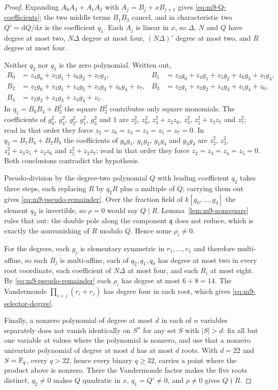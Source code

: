 \begin{proof}
Expanding $A_0A_3+A_1A_2$ with $A_j=B_j+xB_{j+1}$ gives
\eqref{eq:m9-Q-coefficients}; the two middle terms $B_1B_3$ cancel, and in
characteristic two $Q'=\mathrm dQ/\mathrm dx$ is the coefficient $q_1$.  Each
$A_j$ is linear in $x$, so $\Delta$, $N$ and $Q$ have degree at most two,
$N\Delta$ degree at most four, $(N\Delta)'$ degree at most two, and $R$
degree at most four.

Neither $q_2$ nor $q_1$ is the zero polynomial.  Written out,
\[
\begin{aligned}
 B_0&=z_4g_0+z_5g_1+z_6g_2+z_7g_3,&
 B_1&=z_3g_0+z_4g_1+z_5g_2+z_6g_3+z_7g_4,\\
 B_2&=z_2g_0+z_3g_1+z_4g_2+z_5g_3+z_6g_4+z_7,&
 B_3&=z_2g_1+z_3g_2+z_4g_3+z_5g_4+z_6,\\
 B_4&=z_2g_2+z_3g_3+z_4g_4+z_5 .
\end{aligned}
\]
In $q_1=B_0B_4+B_2^2$ the square $B_2^2$ contributes only square monomials.
The coefficients of $g_0^2$, $g_4^2$, $g_2^2$, $g_1^2$, $g_3^2$ and $1$ are
$z_2^2$, $z_6^2$, $z_4^2+z_2z_6$, $z_3^2$, $z_5^2+z_3z_7$ and $z_7^2$; read
in that order they force $z_2=z_6=z_4=z_3=z_5=z_7=0$.  In
$q_2=B_1B_4+B_2B_3$ the coefficients of $g_0g_1$, $g_1g_2$, $g_1g_4$ and
$g_3g_4$ are $z_2^2$, $z_3^2$, $z_4^2+z_3z_5+z_2z_6$ and $z_5^2+z_3z_7$; read
in that order they force $z_2=z_3=z_4=z_5=0$.  Both conclusions contradict
the hypothesis.

Pseudo-division by the degree-two polynomial $Q$ with leading coefficient
$q_2$ takes three steps, each replacing $R$ by $q_2R$ plus a multiple of $Q$;
carrying them out gives \eqref{eq:m9-pseudo-remainder}.  Over the fraction
field of $k[g_0,\ldots,g_4]$ the element $q_2$ is invertible, so $\rho=0$ would
say $Q\mid R$.  Lemma~\ref{lem:m9-nonsquare} rules that out: the double pole
along the component $\mathfrak q$ does not reduce, which is exactly the
nonvanishing of $R$ modulo $Q$.  Hence some $\rho_i\neq0$.

For the degrees, each $g_j$ is elementary symmetric in $r_1,\ldots,r_5$ and
therefore multi-affine, so each $B_j$ is multi-affine, each of
$q_2,q_1,q_0$ has
degree at most two in every root coordinate, each coefficient of $N\Delta$ at
most four, and each $R_i$ at most eight.  By
\eqref{eq:m9-pseudo-remainder} each $\rho_i$ has degree at most
$6+8=14$.  The Vandermonde $\prod_{i<j}(r_i+r_j)$ has degree four in each
root, which gives \eqref{eq:m9-selector-degree}.

Finally, a nonzero polynomial of degree at most $d$ in each of $n$ variables
separately does not vanish identically on $S^n$ for any set $S$ with
$|S|>d$: fix all but one variable at values where the polynomial is nonzero,
and use that a nonzero univariate polynomial of degree at most $d$ has at
most $d$ roots.  With $d=22$ and $S=\mathbb F_q$, every $q>22$, hence every binary
$q\geq32$, carries a point where the product above is nonzero.  There the
Vandermonde factor makes the five roots distinct, $q_2\neq0$ makes $Q$
quadratic in $x$, $q_1=Q'\neq0$, and $\rho\neq0$ gives $Q\nmid R$.
\end{proof}

